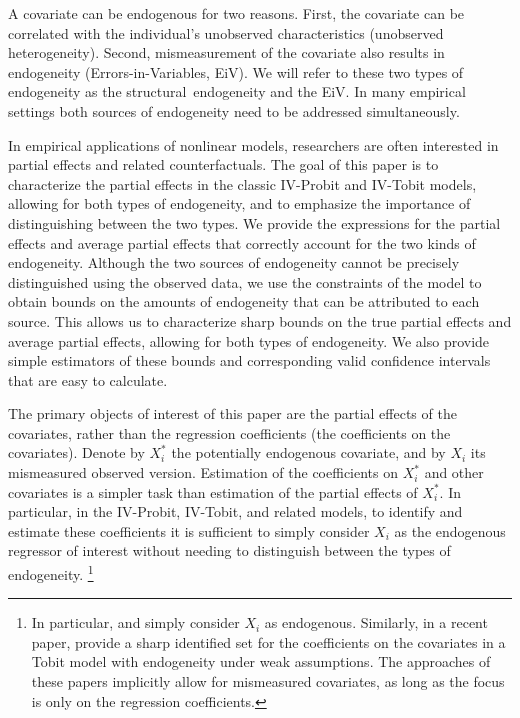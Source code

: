 \documentclass[12pt]{article}
\begin{document}
A covariate can be endogenous for two reasons. First, the covariate can be
correlated with the individual's unobserved characteristics (unobserved
heterogeneity). Second, mismeasurement of the covariate also results in
endogeneity (Errors-in-Variables, EiV). We will refer to these two types of
endogeneity as the structural\ endogeneity and the EiV. In many empirical
settings both sources of endogeneity need to be addressed simultaneously.

In empirical applications of nonlinear models, 
researchers are often interested in partial effects and related counterfactuals. The goal of this paper is to characterize the partial effects in the classic IV-Probit and IV-Tobit models, allowing for both types of endogeneity, and to emphasize the
importance of distinguishing between the two types. We provide the
expressions for the partial effects and average partial effects that
correctly account for the two kinds of endogeneity. Although the two sources
of endogeneity cannot be precisely distinguished using the observed data, we
use the constraints of the model to obtain bounds on the amounts of
endogeneity that can be attributed to each source. This allows us to
characterize sharp bounds on the true partial effects and average partial effects,
allowing for both types of endogeneity. We also provide simple estimators of
these bounds and corresponding valid confidence intervals that are easy to
calculate.

The primary objects of interest of this paper are the partial effects of the
covariates, rather than the regression coefficients (the coefficients on the
covariates). Denote by $X_{i}^{\ast }$ the potentially endogenous covariate, %
 and by $X_{i}$ its mismeasured observed version. Estimation of the coefficients on $%
X_{i}^{\ast }$ and other covariates is a simpler task than estimation of the
partial effects of $X_{i}^{\ast }$. In particular, in the IV-Probit,
IV-Tobit, and related models, to identify and estimate these coefficients it
is sufficient to simply consider $X_{i}$ as the endogenous regressor of
interest without needing to distinguish between the types of endogeneity.%
\footnote{%
In particular, \cite{SmithBlundell1986Ecta} and \cite{RiversVuong1988JoE}
simply consider $X_{i}$ as endogenous. Similarly, in a recent paper, \cite%
{ChesherKimRosen2023JoE} provide a sharp identified set for the coefficients
on the covariates in a Tobit model with endogeneity under weak assumptions.
The approaches of these papers implicitly allow for mismeasured covariates,
as long as the focus is only on the regression coefficients.} %
\end{document}
